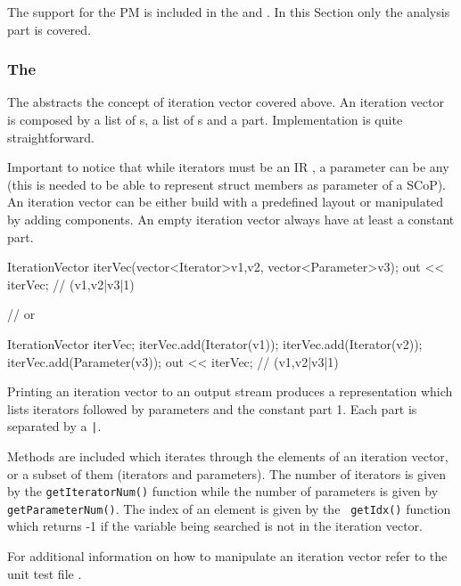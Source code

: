 The support for the PM is included in the  and
. In this Section only the analysis part is covered. 

\subsubsection{The }

The  abstracts the concept of iteration
vector covered above. An iteration vector is composed by a list of
s, a list of s and a  part.
Implementation is quite straightforward. 

Important to notice that while iterators must be an IR , a
parameter can be any  (this is needed to be able to represent
struct members as parameter of a SCoP). An iteration vector can be either build
with a predefined layout or manipulated by adding components. An empty iteration
vector always have at least a constant part. 

\begin{srcCode}
IterationVector iterVec(vector<Iterator>{v1,v2}, vector<Parameter>{v3});
out << iterVec; // (v1,v2|v3|1)

// or 

IterationVector iterVec;
iterVec.add(Iterator(v1));
iterVec.add(Iterator(v2));
iterVec.add(Parameter(v3));
out << iterVec; // (v1,v2|v3|1)
\end{srcCode}

Printing an iteration vector to an output stream produces a representation which
lists iterators followed by parameters and the constant part 1. Each part is
separated by a {\tt |}. 

Methods are included which iterates through the elements of an iteration vector,
or a subset of them (iterators and parameters). The number of iterators is given
by the {\tt getIteratorNum()} function while the number of parameters is given
by {\tt getParameterNum()}. The index of an element is given by the {\tt
getIdx()} function which returns -1 if the variable being searched is not in the
iteration vector. 

For additional information on how to manipulate an iteration vector refer to the
unit test file . 

